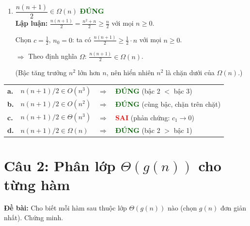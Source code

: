 \documentclass[12pt,a4paper]{article}
\begin{document}
\begin{enumerate}[label=\textbf{\alph*.}]
  \bigskip

  \item $\dfrac{n(n+1)}{2} \in \Omega(n)$ \hfill \textcolor{darkgreen}{\textbf{ĐÚNG}} \\[4pt]
  \textbf{Lập luận:} $\frac{n(n+1)}{2} = \frac{n^2+n}{2} \geq \frac{n}{2}$ với mọi $n \geq 0$.

  Chọn $c = \frac{1}{2}$, $n_0 = 0$: ta có $\frac{n(n+1)}{2} \geq \frac{1}{2} \cdot n$ với mọi $n \geq 0$.

  $\Longrightarrow$ Theo định nghĩa $\Omega$: $\frac{n(n+1)}{2} \in \Omega(n)$. \checkmark

  (Bậc tăng trưởng $n^2$ lớn hơn $n$, nên hiển nhiên $n^2$ là chặn dưới của $\Omega(n)$.)

\end{enumerate}

\begin{resultbox}
\renewcommand{\arraystretch}{1.4}
\begin{tabular}{llcl}
  \textbf{a.} & $n(n+1)/2 \in O(n^3)$      & $\Longrightarrow$ & \textcolor{darkgreen}{\textbf{ĐÚNG}} (bậc 2 $<$ bậc 3) \\
  \textbf{b.} & $n(n+1)/2 \in O(n^2)$      & $\Longrightarrow$ & \textcolor{darkgreen}{\textbf{ĐÚNG}} (cùng bậc, chặn trên chặt) \\
  \textbf{c.} & $n(n+1)/2 \in \Theta(n^3)$ & $\Longrightarrow$ & \textcolor{red}{\textbf{SAI}} (phản chứng: $c_1 \to 0$) \\
  \textbf{d.} & $n(n+1)/2 \in \Omega(n)$   & $\Longrightarrow$ & \textcolor{darkgreen}{\textbf{ĐÚNG}} (bậc 2 $>$ bậc 1) \\
\end{tabular}
\end{resultbox}

\newpage
\section{Câu 2: Phân lớp $\Theta(g(n))$ cho từng hàm}

\textbf{Đề bài:} Cho biết mỗi hàm sau thuộc lớp $\Theta(g(n))$ nào (chọn $g(n)$ đơn giản nhất). Chứng minh.

\bigskip
\end{document}
